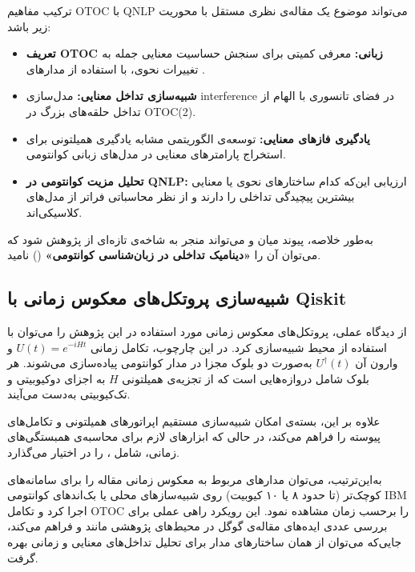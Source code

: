 ترکیب مفاهیم OTOC با QNLP می‌تواند موضوع یک مقاله‌ی نظری مستقل با محوریت زیر باشد:
\begin{itemize}
	\item \textbf{تعریف OTOC زبانی:} معرفی کمیتی برای سنجش حساسیت معنایی جمله به تغییرات نحوی، با استفاده از مدارهای .
	\item \textbf{شبیه‌سازی تداخل معنایی:} مدل‌سازی interference در فضای تانسوری با الهام از تداخل حلقه‌های بزرگ در OTOC(2).
	\item \textbf{یادگیری فازهای معنایی:} توسعه‌ی الگوریتمی مشابه یادگیری همیلتونی برای استخراج پارامترهای معنایی در مدل‌های زبانی کوانتومی.
	\item \textbf{تحلیل مزیت کوانتومی در QNLP:} ارزیابی این‌که کدام ساختارهای نحوی یا معنایی بیشترین پیچیدگی تداخلی را دارند و از نظر محاسباتی فراتر از مدل‌های کلاسیکی‌اند.
\end{itemize}

به‌طور خلاصه، پیوند میان  و  می‌تواند منجر به شاخه‌ی تازه‌ای از پژوهش شود که می‌توان آن را \textbf{«دینامیک تداخلی در زبان‌شناسی کوانتومی»} () نامید.
\subsection{شبیه‌سازی پروتکل‌های معکوس زمانی با Qiskit}
\label{sec:qiskit-sim}

از دیدگاه عملی، پروتکل‌های معکوس زمانی مورد استفاده در این پژوهش را می‌توان با استفاده از محیط  شبیه‌سازی کرد.  
در این چارچوب، تکامل زمانی \( U(t) = e^{-iHt} \) و وارون آن \( U^\dagger(t) \) به‌صورت دو بلوک مجزا در مدار کوانتومی پیاده‌سازی می‌شوند.  
هر بلوک شامل دروازه‌هایی است که از تجزیه‌ی همیلتونی \(H\) به اجزای دوکیوبیتی و تک‌کیوبیتی به‌دست می‌آیند.

علاوه بر این، بسته‌ی  امکان شبیه‌سازی مستقیم اپراتورهای همیلتونی و تکامل‌های پیوسته را فراهم می‌کند،  
در حالی که  ابزارهای لازم برای محاسبه‌ی همبستگی‌های زمانی، شامل ، را در اختیار می‌گذارد.

به‌این‌ترتیب، می‌توان مدارهای مربوط به معکوس زمانی مقاله را برای سامانه‌های کوچک‌تر (تا حدود ۸ یا ۱۰ کیوبیت) روی شبیه‌سازهای محلی یا بک‌اندهای کوانتومی IBM اجرا کرد و تکامل OTOC را برحسب زمان مشاهده نمود.  
این رویکرد راهی عملی برای بررسی عددی ایده‌های مقاله‌ی گوگل در محیط‌های پژوهشی مانند  و  فراهم می‌کند، جایی‌که می‌توان از همان ساختارهای مدار برای تحلیل تداخل‌های معنایی و زمانی بهره گرفت.



